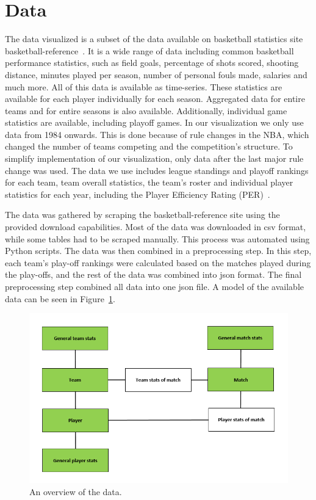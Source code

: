 \documentclass[]{sigchi}
\begin{document}
\section{Data}\label{sec:data}
The data visualized is a subset of the data available on basketball statistics
site basketball-reference~\cite{basketball-reference}. It is a wide range of data including common basketball performance statistics, such as field goals, percentage of shots scored, shooting distance, minutes played per season, number of personal fouls made, salaries and much more. All of this data is available as time-series. These statistics are available for each player individually for each season. Aggregated data for entire teams and for entire seasons is also available. Additionally, individual game statistics are available, including playoff games. In our visualization we only use data from 1984 onwards. This is done because of rule changes in the NBA, which changed the number of teams competing and the
competition's structure. To simplify implementation of our visualization, only
data after the last major rule change was used.  The data we use includes league
standings and playoff rankings for each team, team overall statistics, the
team's roster and individual player statistics for each year, including the 
Player Efficiency Rating (PER)~\cite{per}. 

The data was gathered by scraping the basketball-reference site using the
provided download capabilities. Most of the data was downloaded in csv format,
while some tables had to be scraped manually. This process was automated using
Python scripts. The data was then combined in a preprocessing step. In this
step, each team's play-off rankings were calculated based on the matches played
during the play-offs, and the rest of the data was combined into json format. The
final preprocessing step combined all data into one json file. A model of the
available data can be seen in Figure~\ref{fig:data}.

\begin{figure}
\centering
  \includegraphics[width=1.0\columnwidth]{figures/data}
  \caption{An overview of the data.}
  \label{fig:data}
\end{figure}
\end{document}
